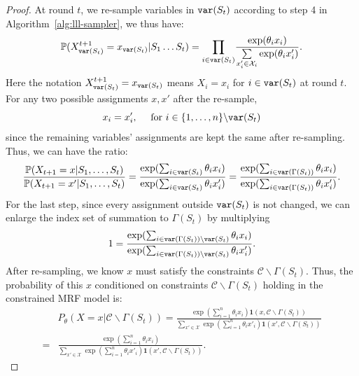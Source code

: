 \begin{lemma}
\begin{proof}
        At round $t$, we re-sample variables in $\mathtt{var}(S_t)$ according to step 4 in
        Algorithm~\ref{alg:lll-sampler}, we thus have:
        \begin{equation*}
            \mathbb{P}(X^{t+1}_{\mathtt{var}(S_t)}=x_{\mathtt{var}(S_t)}|S_1 \ldots S_t)=\underset{{i\in\mathtt{var}(S_t)}}{\prod}\frac{\exp(\theta_i x_i)}{\underset{x'_i\in \mathcal{X}_i}{\sum}\exp(\theta_ix'_i)}.
        \end{equation*}
        Here the notation $X^{t+1}_{\mathtt{var}(S_t)}=x_{\mathtt{var}(S_t)}$ means $X_i=x_i$ for $i\in\mathtt{var}(S_t)$ at round $t$. For any two possible assignments $x,x'$ after the re-sample,
        \begin{equation*}
            x_i=x'_i,\quad \text{ for }i\in \{1,\ldots,n\}\backslash \mathtt{var}(S_t)
        \end{equation*}
        since the remaining variables' assignments are kept the same after re-sampling. Thus, we can have the ratio:
        \begin{equation}\label{eq:ratio-nelson}
            \frac{\mathbb{P}(X_{t+1}=x|S_1,\ldots,S_t)}{\mathbb{P}(X_{t+1}=x'|S_1,\ldots, S_t)}=\frac{\exp(\sum_{i\in\mathtt{var}(S_t)}\theta_ix_i)}{\exp(\sum_{i\in\mathtt{var}(S_t)}\theta_ix'_i)} =\frac{\exp(\sum_{i\in\mathtt{var}(\Gamma(S_t))}\theta_ix_i)}{\exp(\sum_{i\in\mathtt{var}(\Gamma(S_t))}\theta_ix'_i)}.
        \end{equation}
        For the last step, since every assignment outside $\mathtt{var}(S_t)$ is not changed, we can enlarge the index set of summation to $\Gamma(S_t)$ by multiplying
        \begin{align*}
            1 = \frac{\exp(\sum_{i\in\mathtt{var}(\Gamma(S_t)) \backslash \mathtt{var}(S_t)}\theta_ix_i)}{\exp(\sum_{i\in\mathtt{var}(\Gamma(S_t))\backslash \mathtt{var}(S_t)}\theta_ix'_i)}.
        \end{align*}
        After re-sampling, we know $x$ must satisfy the constraints $\mathcal{C}\backslash\Gamma(S_t)$. Thus, the probability of this $x$ conditioned on constraints $\mathcal{C}\backslash\Gamma(S_t)$ holding in the constrained MRF model is:
        \begin{align*}
              & P_{\theta}(X=x|\mathcal{C} \backslash \Gamma(S_t))
            =\frac{\exp(\sum_{i=1}^n\theta_i x_i)\mathbf{1}(x,\mathcal{C}\backslash \Gamma(S_t))}{\sum_{x'\in\mathcal{X}} \exp(\sum_{i=1}^n\theta_i x'_i)\mathbf{1}\left(x',\mathcal{C}\backslash \Gamma(S_t)\right)} \nonumber \\
            = & \frac{\exp(\sum_{i=1}^n\theta_i x_i)}{\sum_{x'\in\mathcal{X}} \exp(\sum_{i=1}^n\theta_i x'_i)\mathbf{1}\left(x',\mathcal{C}\backslash \Gamma(S_t)\right)}.

\end{align*}
\end{proof}
\end{lemma}
